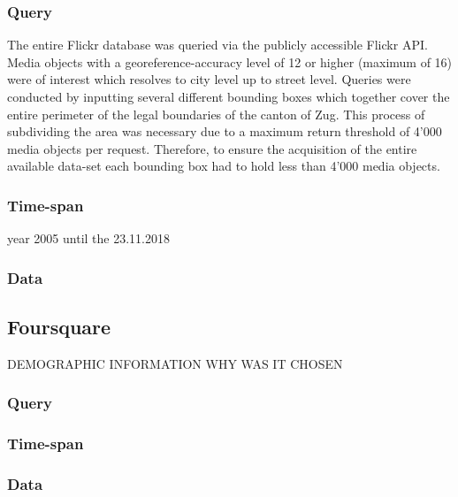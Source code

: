 \subsubsection{Query} \label{flickr_query}
The entire Flickr database was queried via the publicly accessible Flickr API. Media objects with a georeference-accuracy level of 12 or higher (maximum of 16) were of interest which resolves to city level up to street level. Queries were conducted by inputting several different bounding boxes which together cover the entire perimeter of the legal boundaries of the canton of Zug. This process of subdividing the area was necessary due to a maximum return threshold of 4\rq000 media objects per request. Therefore, to ensure the acquisition of the entire available data-set each bounding box had to hold less than 4’000 media objects.
\subsubsection{Time-span} \label{flickr_timespan}
year 2005 until the 23.11.2018
\subsubsection{Data} \label{flickr_data}

\subsection{Foursquare} \label{foursquare}
DEMOGRAPHIC INFORMATION
WHY WAS IT CHOSEN
\subsubsection{Query} \label{fq_query}
\subsubsection{Time-span} \label{fq_timespan}
\subsubsection{Data} \label{fq_data}






